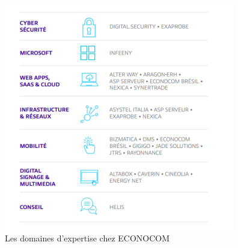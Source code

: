 \begin{figure}[h]
\begin{center}
\includegraphics[scale=0.70]{Domaines_Econocom.png}
\caption[Les domaines d'expertise chez ECONOCOM]{Les domaines d'expertise chez ECONOCOM}
\label{monlabel}
\end{center}
\end{figure}






